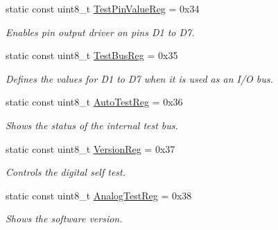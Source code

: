 \begin{DoxyCompactItemize}
\mbox{\label{classMFRC522_ad5b177065c774237eb2756a7209ebaac}} 
static const uint8\+\_\+t \hyperlink{classMFRC522_ad5b177065c774237eb2756a7209ebaac}{Test\+Pin\+Value\+Reg} = 0x34
\begin{DoxyCompactList}\small\item\em Enables pin output driver on pins D1 to D7. \end{DoxyCompactList}\item 
\mbox{\label{classMFRC522_acced8d7ea05d430a8f48ee5d30c63443}} 
static const uint8\+\_\+t \hyperlink{classMFRC522_acced8d7ea05d430a8f48ee5d30c63443}{Test\+Bus\+Reg} = 0x35
\begin{DoxyCompactList}\small\item\em Defines the values for D1 to D7 when it is used as an I/O bus. \end{DoxyCompactList}\item 
\mbox{\label{classMFRC522_a763839e9e665049bc5ea0c754aaa47a4}} 
static const uint8\+\_\+t \hyperlink{classMFRC522_a763839e9e665049bc5ea0c754aaa47a4}{Auto\+Test\+Reg} = 0x36
\begin{DoxyCompactList}\small\item\em Shows the status of the internal test bus. \end{DoxyCompactList}\item 
\mbox{\label{classMFRC522_a87c131b5dc310dd451ed2339bc2acf04}} 
static const uint8\+\_\+t \hyperlink{classMFRC522_a87c131b5dc310dd451ed2339bc2acf04}{Version\+Reg} = 0x37
\begin{DoxyCompactList}\small\item\em Controls the digital self test. \end{DoxyCompactList}\item 
\mbox{\label{classMFRC522_ad05c5ce439020bd080a2102804e3ad96}} 
static const uint8\+\_\+t \hyperlink{classMFRC522_ad05c5ce439020bd080a2102804e3ad96}{Analog\+Test\+Reg} = 0x38
\begin{DoxyCompactList}\small\item\em Shows the software version. \end{DoxyCompactList}\item 
\mbox{\label{classMFRC522_a58755b48e8eed115aa5650e8bfb8986f}} 

\end{DoxyCompactItemize}
